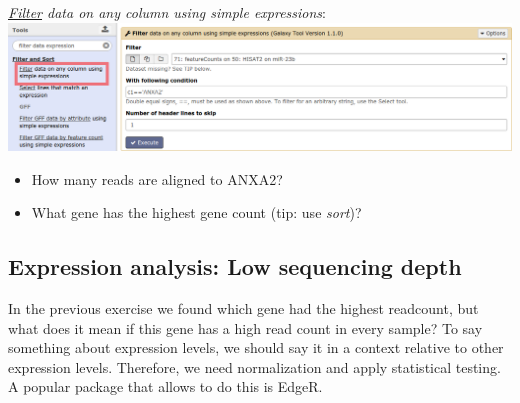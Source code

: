 \documentclass[11pt,a4paper]{article}
\begin{document}
\textit{\underline{Filter} data on any column using simple expressions}:\\
\includegraphics[width=\textwidth]{figures/expression_02.png}\\
\begin{itemize}
	\item How many reads are aligned to ANXA2?
	\item What gene has the highest gene count (tip: use \textit{sort})?
\end{itemize}

\subsection{Expression analysis: Low sequencing depth}
In the previous exercise we found which gene had the highest readcount, but what does it mean if this gene has a high read count in every sample? To say something about expression levels, we should say it in a context relative to other expression levels. Therefore, we need normalization and apply statistical testing. A popular package that allows to do this is EdgeR.
\end{document}
